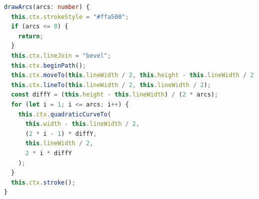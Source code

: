 \begin{lstlisting}[language=TypeScript,caption={Implementation of drawing a variable amount of arc symbols},label={lst:drawArcs}]
drawArcs(arcs: number) {
  this.ctx.strokeStyle = "#ffa500";
  if (arcs <= 0) {
    return;
  }
  this.ctx.lineJoin = "bevel";
  this.ctx.beginPath();
  this.ctx.moveTo(this.lineWidth / 2, this.height - this.lineWidth / 2);
  this.ctx.lineTo(this.lineWidth / 2, this.lineWidth / 2);
  const diffY = (this.height - this.lineWidth) / (2 * arcs);
  for (let i = 1; i <= arcs; i++) {
    this.ctx.quadraticCurveTo(
      this.width - this.lineWidth / 2,
      (2 * i - 1) * diffY,
      this.lineWidth / 2,
      2 * i * diffY
    );
  }
  this.ctx.stroke();
}
\end{lstlisting}
